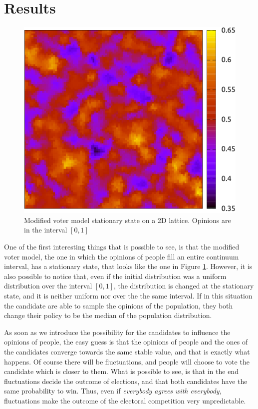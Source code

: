 \documentclass[11pt,a4paper,twocolumn]{article}
\begin{document}
\section*{Results}
\begin{figure}
\includegraphics[scale=1]{pictures/voter_mod-crop.pdf}
\caption{Modified voter model stationary state on a 2D lattice. Opinions are in the interval $[0,1]$}
\label{fig:voter.mod}
\end{figure}

One of the first interesting things that is possible to see, is that the modified voter model, the one in which the opinions of people fill an entire continuum interval, has a stationary state, that looks like the one in Figure \ref{fig:voter.mod}. However, it is also possible to notice that, even if the initial distribution was a uniform distribution over the interval $[0,1]$, the distribution is changed at the stationary state, and it is neither uniform nor over the the same interval.
If in this situation the candidate are able to sample the opinions of the population, they both change their policy to be the median of the population distribution.

As soon as we introduce the possibility for the candidates to influence the opinions of people, the easy guess is that the opinions of people and the ones of the candidates converge towards the same stable value, and that is exactly what happens. Of course there will be fluctuations, and people will choose to vote the candidate which is closer to them. What is possible to see, is that in the end fluctuations decide the outcome of elections, and that both candidates have the same probability to win. Thus, even if \emph{everybody agrees with everybody}, fluctuations make the outcome of the electoral competition very unpredictable.
\end{document}
